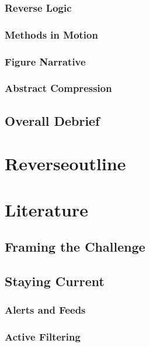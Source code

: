 \documentclass[12pt]{article}
\begin{document}
\subsubsection{Reverse Logic}
\subsubsection{Methods in Motion}
\subsubsection{Figure Narrative}
\subsubsection{Abstract Compression}
\subsection{Overall Debrief}

\section{Reverseoutline}

\section{Literature}
\subsection{Framing the Challenge}
\subsection{Staying Current}
\subsubsection{Alerts and Feeds}
\subsubsection{Active Filtering}
\end{document}
